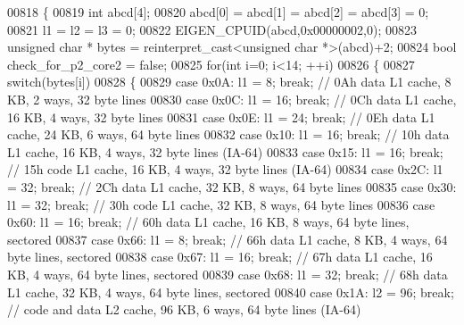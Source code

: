 \begin{DoxyCode}
{00818 \{
00819   \textcolor{keywordtype}{int} abcd[4];
00820   abcd[0] = abcd[1] = abcd[2] = abcd[3] = 0;
00821   l1 = l2 = l3 = 0;
00822   EIGEN\_CPUID(abcd,0x00000002,0);
00823   \textcolor{keywordtype}{unsigned} \textcolor{keywordtype}{char} * bytes = \textcolor{keyword}{reinterpret\_cast<}\textcolor{keywordtype}{unsigned} \textcolor{keywordtype}{char} *\textcolor{keyword}{>}(abcd)+2;
00824   \textcolor{keywordtype}{bool} check\_for\_p2\_core2 = \textcolor{keyword}{false};
00825   \textcolor{keywordflow}{for}(\textcolor{keywordtype}{int} i=0; i<14; ++i)
00826   \{
00827     \textcolor{keywordflow}{switch}(bytes[i])
00828     \{
00829       \textcolor{keywordflow}{case} 0x0A: l1 = 8; \textcolor{keywordflow}{break};   \textcolor{comment}{// 0Ah   data L1 cache, 8 KB, 2 ways, 32 byte lines}
00830       \textcolor{keywordflow}{case} 0x0C: l1 = 16; \textcolor{keywordflow}{break};  \textcolor{comment}{// 0Ch   data L1 cache, 16 KB, 4 ways, 32 byte lines}
00831       \textcolor{keywordflow}{case} 0x0E: l1 = 24; \textcolor{keywordflow}{break};  \textcolor{comment}{// 0Eh   data L1 cache, 24 KB, 6 ways, 64 byte lines}
00832       \textcolor{keywordflow}{case} 0x10: l1 = 16; \textcolor{keywordflow}{break};  \textcolor{comment}{// 10h   data L1 cache, 16 KB, 4 ways, 32 byte lines (IA-64)}
00833       \textcolor{keywordflow}{case} 0x15: l1 = 16; \textcolor{keywordflow}{break};  \textcolor{comment}{// 15h   code L1 cache, 16 KB, 4 ways, 32 byte lines (IA-64)}
00834       \textcolor{keywordflow}{case} 0x2C: l1 = 32; \textcolor{keywordflow}{break};  \textcolor{comment}{// 2Ch   data L1 cache, 32 KB, 8 ways, 64 byte lines}
00835       \textcolor{keywordflow}{case} 0x30: l1 = 32; \textcolor{keywordflow}{break};  \textcolor{comment}{// 30h   code L1 cache, 32 KB, 8 ways, 64 byte lines}
00836       \textcolor{keywordflow}{case} 0x60: l1 = 16; \textcolor{keywordflow}{break};  \textcolor{comment}{// 60h   data L1 cache, 16 KB, 8 ways, 64 byte lines, sectored}
00837       \textcolor{keywordflow}{case} 0x66: l1 = 8; \textcolor{keywordflow}{break};   \textcolor{comment}{// 66h   data L1 cache, 8 KB, 4 ways, 64 byte lines, sectored}
00838       \textcolor{keywordflow}{case} 0x67: l1 = 16; \textcolor{keywordflow}{break};  \textcolor{comment}{// 67h   data L1 cache, 16 KB, 4 ways, 64 byte lines, sectored}
00839       \textcolor{keywordflow}{case} 0x68: l1 = 32; \textcolor{keywordflow}{break};  \textcolor{comment}{// 68h   data L1 cache, 32 KB, 4 ways, 64 byte lines, sectored}
00840       \textcolor{keywordflow}{case} 0x1A: l2 = 96; \textcolor{keywordflow}{break};   \textcolor{comment}{// code and data L2 cache, 96 KB, 6 ways, 64 byte lines (IA-64)}
}
\end{DoxyCode}
